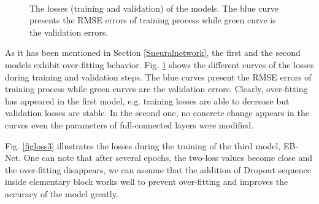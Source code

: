 \documentclass[review]{elsarticle}
\begin{document}
\begin{figure}[htbp]
    \centering
    ~~
\\    
    \caption{The losses (training and validation) of the models. The
      blue curve presents the RMSE errors of training process while
      green curve is the validation errors.}
    
    \label{figlosses}
\end{figure}
As it has been mentioned in Section \ref{Sneuralnetwork}, the first
and the second models exhibit over-fitting
behavior. Fig. \ref{figlosses} shows the different curves of the
losses during training and validation steps. The blue curves present
the RMSE errors of training process while green curves are the
validation errors. Clearly, over-fitting has appeared in the first
model, e.g. training losses are able to decrease but validation
losses are stable. In the second one, no concrete change appears in the curves even the parameters of full-connected layers were modified.

Fig. \ref{figloss3} illustrates the losses during the training of the
third model, EB-Net. One can note that after several epochs, the
two-loss values become close and the over-fitting disappears, we can
assume that the addition of Dropout sequence inside elementary block works well to prevent over-fitting and improves the accuracy of the model greatly.
\end{document}
